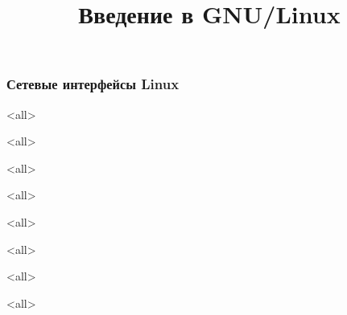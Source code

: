 
\title{Введение в GNU/Linux}








\begin{frame}
	\frametitle{Сетевые интерфейсы Linux}
	\titlepage
	\vspace{-0.5cm}
	\begin{center}
	\end{center}
\end{frame}
\begin{frame}
	\tableofcontents
\end{frame}

\mode<all>{}

\mode<all>{}

\mode<all>{}

\mode<all>{}

\mode<all>{}

\mode<all>{}

\mode<all>{}

\mode<all>{}


